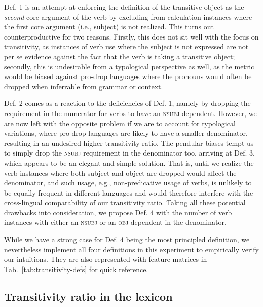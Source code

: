 Def. 1 is an attempt at enforcing the definition of the transitive object as the \textit{second} core argument of the verb by excluding from calculation instances where the first core argument (i.e., subject) is not realized. This turns out counterproductive for two reasons. Firstly, this does not sit well with the focus on transitivity, as instances of verb use where the subject is not expressed are not per se evidence against the fact that the verb is taking a transitive object; secondly, this is undesirable from a typological perspective as well, as the metric would be biased against pro-drop languages where the pronouns would often be dropped when inferrable from grammar or context. 

Def. 2 comes as a reaction to the deficiencies of Def. 1, namely by dropping the requirement in the numerator for verbs to have an \textsc{nsubj} dependent. However, we are now left with the opposite problem if we are to account for typological variations, where pro-drop languages are likely to have a smaller denominator, resulting in an undesired higher transitivity ratio. The pendular biases tempt us to simply drop the \textsc{nsubj} requirement in the denominator too, arriving at Def. 3, which appears to be an elegant and simple solution. That is, until we realize the verb instances where both subject and object are dropped would affect the denominator, and such usage, e.g., non-predicative usage of verbs, is unlikely to be equally frequent in different languages and would therefore interfere with the cross-lingual comparability of our transitivity ratio. Taking all these potential drawbacks into consideration, we propose Def. 4 with the number of verb instances with either an \textsc{nsubj} or an \textsc{obj} dependent in the denominator. 



While we have a strong case for Def. 4 being the most principled definition, we nevertheless implement all four definitions in this experiment to empirically verify our intuitions. They are also represented with feature matrices in Tab.~\ref{tab:transitivity-defs} for quick reference.

\subsection{Transitivity ratio in the lexicon}

